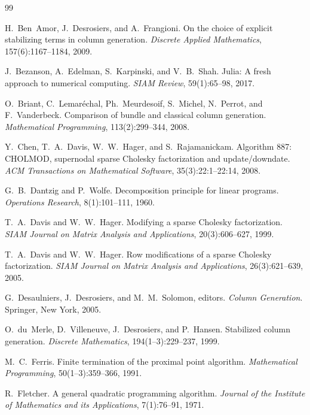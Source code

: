 \begin{thebibliography}{99}

H.~Ben~Amor, J.~Desrosiers, and A.~Frangioni.
\newblock On the choice of explicit stabilizing terms in column generation.
\newblock \emph{Discrete Applied Mathematics}, 157(6):1167--1184, 2009.

J.~Bezanson, A.~Edelman, S.~Karpinski, and V.~B.~Shah.
\newblock Julia: A fresh approach to numerical computing.
\newblock \emph{SIAM Review}, 59(1):65--98, 2017.

O.~Briant, C.~Lemar\'echal, Ph.~Meurdesoif, S.~Michel, N.~Perrot, and F.~Vanderbeck.
\newblock Comparison of bundle and classical column generation.
\newblock \emph{Mathematical Programming}, 113(2):299--344, 2008.

Y.~Chen, T.~A.~Davis, W.~W.~Hager, and S.~Rajamanickam.
\newblock Algorithm 887: CHOLMOD, supernodal sparse Cholesky factorization and
  update/downdate.
\newblock \emph{ACM Transactions on Mathematical Software}, 35(3):22:1--22:14, 2008.

G.~B.~Dantzig and P.~Wolfe.
\newblock Decomposition principle for linear programs.
\newblock \emph{Operations Research}, 8(1):101--111, 1960.

T.~A.~Davis and W.~W.~Hager.
\newblock Modifying a sparse Cholesky factorization.
\newblock \emph{SIAM Journal on Matrix Analysis and Applications}, 20(3):606--627, 1999.

T.~A.~Davis and W.~W.~Hager.
\newblock Row modifications of a sparse Cholesky factorization.
\newblock \emph{SIAM Journal on Matrix Analysis and Applications}, 26(3):621--639, 2005.

G.~Desaulniers, J.~Desrosiers, and M.~M.~Solomon, editors.
\newblock \emph{Column Generation}.
\newblock Springer, New York, 2005.

O.~du~Merle, D.~Villeneuve, J.~Desrosiers, and P.~Hansen.
\newblock Stabilized column generation.
\newblock \emph{Discrete Mathematics}, 194(1--3):229--237, 1999.

M.~C.~Ferris.
\newblock Finite termination of the proximal point algorithm.
\newblock \emph{Mathematical Programming}, 50(1--3):359--366, 1991.

R.~Fletcher.
\newblock A general quadratic programming algorithm.
\newblock \emph{Journal of the Institute of Mathematics and its Applications}, 7(1):76--91, 1971.


\end{thebibliography}
